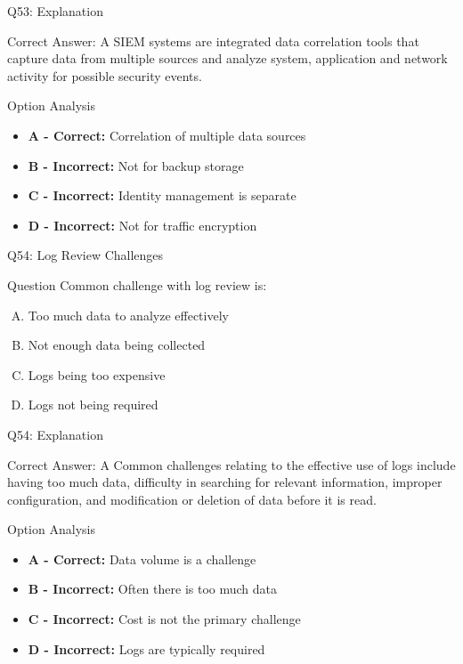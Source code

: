 \documentclass{beamer}
\begin{document}
	\begin{frame}{Q53: Explanation}
		\begin{block}{Correct Answer: A}
			SIEM systems are integrated data correlation tools that capture data from multiple sources and analyze system, application and network activity for possible security events.
		\end{block}
		\begin{block}{Option Analysis}
			\begin{itemize}
				\item \textbf{A - Correct:} Correlation of multiple data sources
				\item \textbf{B - Incorrect:} Not for backup storage
				\item \textbf{C - Incorrect:} Identity management is separate
				\item \textbf{D - Incorrect:} Not for traffic encryption
			\end{itemize}
		\end{block}
	\end{frame}
	
	\begin{frame}{Q54: Log Review Challenges}
		\begin{block}{Question}
			Common challenge with log review is:
		\end{block}
		\begin{enumerate}[(A)]
			\item Too much data to analyze effectively
			\item Not enough data being collected
			\item Logs being too expensive
			\item Logs not being required
		\end{enumerate}
	\end{frame}
	
	\begin{frame}{Q54: Explanation}
		\begin{block}{Correct Answer: A}
			Common challenges relating to the effective use of logs include having too much data, difficulty in searching for relevant information, improper configuration, and modification or deletion of data before it is read.
		\end{block}
		\begin{block}{Option Analysis}
			\begin{itemize}
				\item \textbf{A - Correct:} Data volume is a challenge
				\item \textbf{B - Incorrect:} Often there is too much data
				\item \textbf{C - Incorrect:} Cost is not the primary challenge
				\item \textbf{D - Incorrect:} Logs are typically required
			\end{itemize}
		\end{block}
	\end{frame}
	
\end{document}

